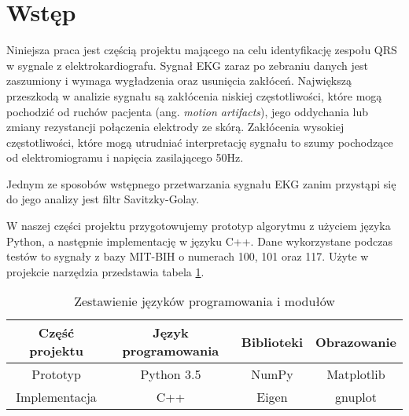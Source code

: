 \section{Wstęp}

Niniejsza praca jest częścią projektu mającego na celu identyfikację zespołu QRS w sygnale z elektrokardiografu. Sygnał EKG zaraz po zebraniu danych jest zaszumiony i wymaga wygładzenia oraz usunięcia zakłóceń. Największą przeszkodą w analizie sygnału są zakłócenia niskiej częstotliwości, które mogą pochodzić od ruchów pacjenta (ang. \textit{motion artifacts}), jego oddychania lub zmiany rezystancji połączenia elektrody ze skórą. Zakłócenia wysokiej częstotliwości, które mogą utrudniać interpretację sygnału to szumy pochodzące od elektromiogramu i napięcia zasilającego 50Hz.

Jednym ze sposobów wstępnego przetwarzania sygnału EKG zanim przystąpi się do jego analizy jest filtr Savitzky-Golay.

W naszej części projektu przygotowujemy prototyp algorytmu z użyciem języka Python, a następnie implementację w języku C++. Dane wykorzystane podczas testów to sygnały z bazy MIT-BIH o numerach 100, 101 oraz 117.
Użyte w projekcie narzędzia przedstawia tabela \ref{tab:tools}.

\begin{table}[!htb]
  \centering
  \begin{tabular}{|c|c|c|c|}
  \hline
  Część projektu & Język programowania & Biblioteki & Obrazowanie \\
  \hline
  Prototyp & Python 3.5 & NumPy & Matplotlib \\
  \hline
  Implementacja & C++ & Eigen & gnuplot \\
  \hline
  \end{tabular}
  \caption{Zestawienie języków programowania i modułów}
  \label{tab:tools}
\end{table}
